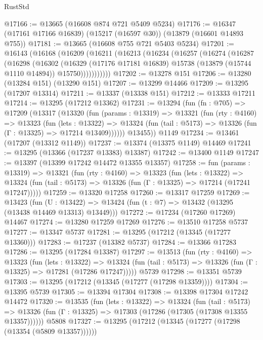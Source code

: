 \begin{lexlean}{RustStd}
\begin{coremodule}
@17166 := @13665 (@16608 @874 @721 @5409 @5234)
@17176 := @16347 (@17161 @17166 @16839) (@15217 (@16597 @30)) (@13879 (@16601 @14893 @755))
@17181 := @13665 (@16608 @755 @721 @5403 @5234)
@17201 := @16143
    (@16168
      (@16209
        (@16211
          (@16213
            (@16234
              (@16257
                (@16274
                  (@16287
                    (@16298
                      (@16302
                        (@16329
                          (@17176 @17181 @16839)
                          @15738
                          (@13879 (@15744 @1110 @14894))
                          @15750)))))))))))
@17202 := @13278 @151
@17206 := @13280 (@13284 @151) (@13290 @151)
@17207 := @13299 @14466
@17209 := @13295 (@17207 @13314)
@17211 := @13337 (@13338 @151)
@17212 := @13333 @17211
@17214 := @13295 (@17212 @13362)
@17231 := @13294
    (fun (fn : @705) =>
    @17209
      (@13317
        (@13320
          (fun (params : @13319) =>
          @13321
            (fun (rty : @4160) =>
            @13323
              (fun (lets : @13322) =>
              @13324 (fun (tail : @5173) => @13326 (fun (Γ : @13325) => @17214 @13409))))))
        @13455))
    @1149
@17234 := @13461 (@17207 (@13312 @1149))
@17237 := @13374 (@13375 @1149) @14469
@17241 := @13295 (@13366 (@17237 @13383) @13387)
@17242 := @13400 @1149
@17247 := @13397 (@13399 @17242 @14472 @13355 @13357)
@17258 := fun (params : @13319) =>
  @13321
    (fun (rty : @4160) =>
    @13323
      (fun (lets : @13322) =>
      @13324 (fun (tail : @5173) => @13326 (fun (Γ : @13325) => @17214 (@17241 @17247)))))
@17259 := @13320 @17258
@17260 := @13317 @17259
@17269 := @13423
    (fun (U : @13422) => @13424 (fun (t : @7) => @13432 (@13295 (@13438 @14469 @13313) @13449)))
@17272 := @17234 (@17260 @17269) @14467
@17274 := @13280 @17259 @17269
@17276 := @13510 @17258 @5737
@17277 := @13347 @5737
@17281 := @13295 (@17212 (@13345 (@17277 @13360)))
@17283 := @17237 (@13382 @5737)
@17284 := @13366 @17283
@17286 := @13295 (@17284 @13387)
@17297 := @13513
    (fun (rty : @4160) =>
    @13323
      (fun (lets : @13322) =>
      @13324 (fun (tail : @5173) => @13326 (fun (Γ : @13325) => @17281 (@17286 @17247)))))
    @5739
@17298 := @13351 @5739
@17303 := @13295 (@17212 (@13345 (@17277 (@17298 @13359))))
@17304 := @13395 @5739
@17305 := @13394 @17304
@17308 := @13398 @17304 @17242 @14472
@17320 := @13535
    (fun (lets : @13322) =>
    @13324
      (fun (tail : @5173) =>
      @13326 (fun (Γ : @13325) => @17303 (@17286 (@17305 (@17308 @13355 @13357))))))
    @5808
@17327 := @13295 (@17212 (@13345 (@17277 (@17298 (@13354 (@5809 @13357))))))

\end{coremodule}
\end{lexlean}
